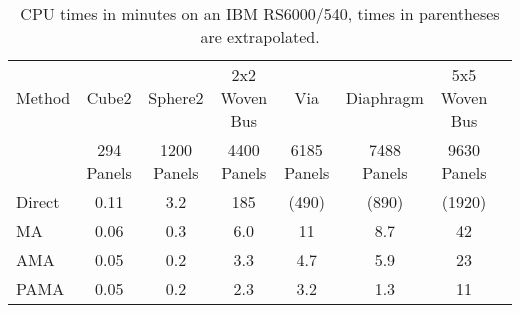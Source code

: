 \begin{table}
\footnotesize
\begin{center}
\begin{tabular}{|l|c|c|c|c|c|c|c|}
\hline
Method & Cube2 & Sphere2 & 2x2 Woven Bus & Via & Diaphragm & 5x5 Woven Bus \\ 
       & 294 Panels & 1200 Panels & 4400 Panels & 6185 Panels & 7488 Panels & 9630 Panels\\
\hline
Direct & 0.11 & 3.2 & 185 & (490) & (890) & (1920)\\ \hline
MA     & 0.06 & 0.3 & 6.0 & 11    & 8.7    & 42\\ \hline
AMA    & 0.05 & 0.2 & 3.3 & 4.7   & 5.9   & 23\\ \hline
PAMA   & 0.05 & 0.2 & 2.3 & 3.2   & 1.3   & 11\\ \hline
\end{tabular}
\caption{CPU times in minutes on an IBM RS6000/540, times in 
parentheses are extrapolated.}
\label{main}
\end{center}
\end{table}














